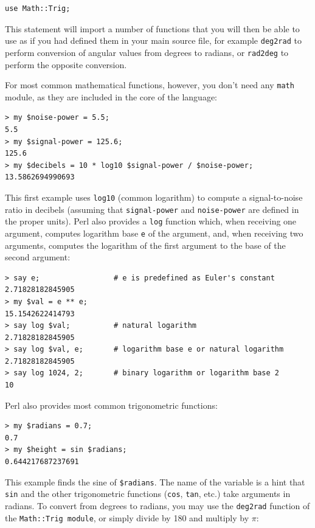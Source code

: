 \begin{verbatim}
use Math::Trig;
\end{verbatim}
%
This statement will import a number of functions that you will then be able to use as if you had defined them in your main source file, for example \verb'deg2rad' to perform conversion of angular values from degrees to radians, or \verb'rad2deg' to perform the opposite conversion.

For most common mathematical functions, however, you don't need any \verb'math' module, as they are included in the core of the language:

\begin{verbatim}
> my $noise-power = 5.5;
5.5
> my $signal-power = 125.6;
125.6
> my $decibels = 10 * log10 $signal-power / $noise-power;
13.5862694990693
\end{verbatim}
%
This first example uses \verb"log10" (common logarithm) 
to compute a signal-to-noise ratio in decibels 
(assuming that \verb"signal-power" and
\verb"noise-power" are defined in the proper units).  Perl 
also provides a {\tt log} function which, when receiving 
one argument, computes logarithm base {\tt e} of the argument, 
and, when receiving two arguments, computes the logarithm 
of the first argument to the base of the second argument:

\begin{verbatim}
> say e;                 # e is predefined as Euler's constant
2.71828182845905
> my $val = e ** e;
15.1542622414793
> say log $val;          # natural logarithm
2.71828182845905
> say log $val, e;       # logarithm base e or natural logarithm
2.71828182845905
> say log 1024, 2;       # binary logarithm or logarithm base 2
10
\end{verbatim}
%


Perl also provides most common trigonometric functions:

\begin{verbatim}
> my $radians = 0.7;
0.7
> my $height = sin $radians;
0.644217687237691
\end{verbatim}

This example finds the sine of \verb'$radians'.  The name of the
variable is a hint that {\tt sin} and the other trigonometric
functions ({\tt cos}, {\tt tan}, etc.)  take arguments 
in radians. To convert from degrees to radians, you may 
use the  \verb'deg2rad' function of the 
\verb'Math::Trig module', or simply divide by 180 
and multiply by $\pi$:

